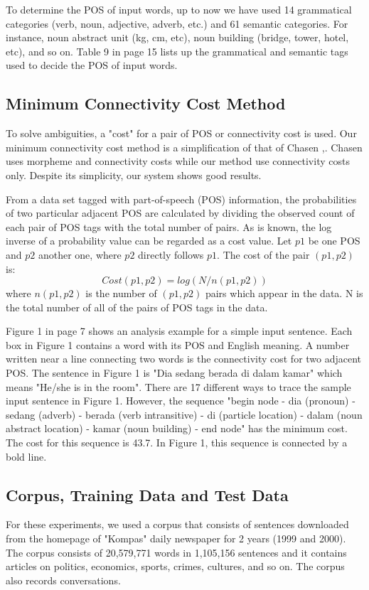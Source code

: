 \documentclass[english]{nlp}
\begin{document}
To determine the POS of input words, up to now we have used 14 grammatical
categories (verb, noun, adjective, adverb, etc.) and 61 semantic
categories. For instance, noun abstract unit (kg, cm, etc), noun
building (bridge, tower, hotel, etc), and so on. Table 9 in
page 15 lists up the grammatical and semantic tags used to decide the
POS of input words.

\subsection{Minimum Connectivity Cost Method}
To solve ambiguities, a "cost" for a pair of POS or
connectivity cost is used.
Our minimum connectivity cost method is a simplification of that of
Chasen \cite{Nagao96},\cite{Matsumoto01}.
Chasen uses morpheme and connectivity costs while our method
use connectivity costs only. Despite its simplicity, our system shows
good results.

From a data set tagged with part-of-speech (POS) information,
the probabilities of two particular adjacent POS are calculated by
dividing the observed count of each pair of POS tags with the total number of pairs.
As is known, the log inverse of a probability value can be regarded
as a cost value.
Let $p1$ be one POS and $p2$ another one, where $p2$ directly follows $p1$.
The cost of the pair $(p1, p2)$ is:
\begin{equation}
Cost(p1,p2) = log(N/n(p1,p2))
\end{equation}
where $n(p1,p2)$ is the number of $(p1, p2)$ pairs which appear in the data.
N is the total number of all of the pairs of POS tags in the data.

Figure 1 in page 7 shows an analysis example for a simple input
sentence. 
Each box in Figure 1 contains a word with its POS and
English meaning.
A number written near a line connecting two words is the connectivity cost 
for two adjacent POS. The sentence in Figure 1 is 
"Dia sedang berada di dalam kamar" which means "He/she is in the room".
There are 17 different ways to trace the sample input sentence in 
Figure 1. However, the sequence "begin node - dia (pronoun) - 
sedang (adverb) - berada (verb intransitive) - di (particle location) 
- dalam (noun abstract location) - kamar (noun building) - end node" 
has the minimum cost. The cost for this sequence is 43.7.
In Figure 1, this sequence is connected by a bold line.

\subsection{Corpus, Training Data and Test Data}
For these experiments, we used a corpus that consists of sentences downloaded
from the homepage of "Kompas" daily newspaper for 2 years (1999 and 2000).
The corpus consists of 20,579,771 words in 1,105,156 sentences and it contains
articles on politics, economics, sports, crimes, cultures, and so on.
The corpus also records conversations.
\end{document}
